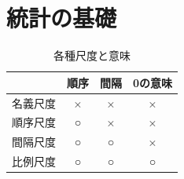 \section{統計の基礎}
\begin{table}[h]
\begin{center}
\begin{tabular}{c|ccc}
    {}& 順序& 間隔& 0の意味\\ \hline
    名義尺度& ×& ×& ×\\
    順序尺度& ○& ×& ×\\
    間隔尺度& ○& ○& ×\\
    比例尺度& ○& ○& ○\\\hline
\end{tabular}
\end{center}
\caption{各種尺度と意味}    
\end{table}